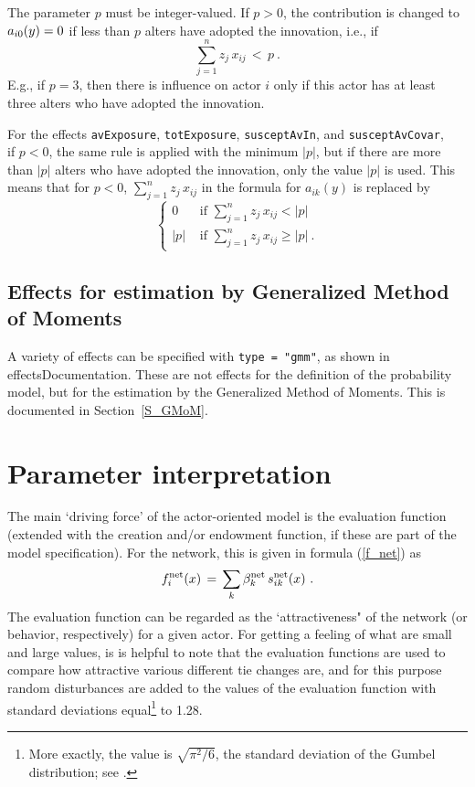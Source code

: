 \documentclass[a4paper,fleqn,11pt]{article}
\newcommand{\+}{\, + \,}
\newcommand{\vit}{\theenumi}
\begin{document}
The parameter $p$ must be integer-valued. If $p > 0$, the contribution is
changed to $a_{i\vit}(y) = 0$ if less than $p$ alters
have adopted the innovation, i.e., if
\[
\sum_{j=1}^n  z_j\, x_{ij} \, < \, p \ .
\]
E.g., if $p=3$, then there is influence on actor $i$ only if
this actor has at least three alters who have adopted the innovation.

For the effects \verb|avExposure|, \verb|totExposure|, \verb|susceptAvIn|,
and \verb|susceptAvCovar|, \\
if $p < 0$,
the same rule is applied with the minimum $|p|$, but if there
are more than $|p|$ alters who have adopted the innovation,
only the value $|p|$ is used.
This means that for $p < 0$,
$\sum_{j=1}^n  z_j\, x_{ij}$ in the formula for
 $a_{ik}(y) $ is replaced by
 \[
 \left\{ \begin{array}{ll}
                0 & \text{  if  } \sum_{j=1}^n  z_j\, x_{ij} < |p| \\[0.9ex]
                |p| & \text{  if  } \sum_{j=1}^n  z_j\, x_{ij} \geq |p| \ .
     \end{array} \right.
 \]

\subsection{Effects for estimation by Generalized Method of Moments}

A variety of effects can be specified with \texttt{type = "gmm"},
as shown in \textsf{effectsDocumentation}.
These are not effects for the definition of the probability model,
but for the estimation by the Generalized Method of Moments.
This is documented in Section~\ref{S_GMoM}.

\newpage
\section{Parameter interpretation}
\label{S_interpret}

The main `driving force' of the actor-oriented model
is the evaluation function
(extended with the creation and/or endowment function, if these are
part of the model specification).
For the network, this is given in formula (\ref{f_net}) as
\[
f^{\rm net}_i(x) \, = \, \sum_k \beta^{\rm net}_k \, s^{\rm net}_{ik}(x)   \ .
\]
The evaluation function can be regarded as the `attractiveness"
of the network (or behavior, respectively) for a given actor.
For getting a feeling of what are small and large values,
is is helpful to note that the evaluation functions are
used to compare how attractive various different tie changes are,
and for this purpose random disturbances are added
to the values of the evaluation function with standard deviations
equal\footnote{More exactly, the value is $\sqrt{\pi^2/6}$,
the standard deviation of the Gumbel
distribution; see \citet{Snijders01}.} to 1.28.
\end{document}
